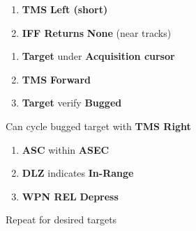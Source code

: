 \begin{checklistenumerate}
    \begin{enumerate}
        \item \textbf{TMS} \dotfill \textbf{Left (short)}
        \item \textbf{IFF Returns} \dotfill \textbf{None} (near tracks)
    \end{enumerate}
    \begin{enumerate}
        \item \label{subsec:aim120:multi:acq}\textbf{Target} \dotfill under \textbf{Acquisition cursor}
        \item \label{subsec:aim120:multi:tmsfwd}\textbf{TMS} \dotfill \textbf{Forward}
        \item \textbf{Target} \dotfill verify \textbf{Bugged}
    \end{enumerate}
    
    Can cycle bugged target with \textbf{TMS Right}
    \begin{enumerate}
        \item \textbf{ASC} \dotfill within \textbf{ASEC}
        \item \textbf{DLZ} \dotfill indicates \textbf{In-Range}
        \item \label{subsec:aim120:multi:wpnrel}\textbf{WPN REL} \dotfill \textbf{Depress}
    \end{enumerate}
    Repeat  for desired targets
\end{checklistenumerate}

\marginfigrestore